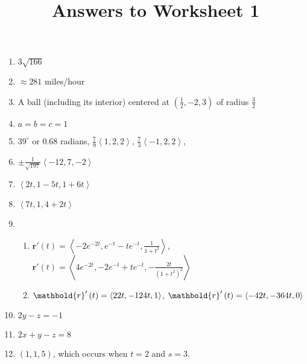 \documentclass[12pt]{article}
\title{Answers to Worksheet 1}
\author{}\date{}
\let\sin\relax\DeclareMathOperator{\sin}{\mathsf{sin}}
\let\cos\relax\DeclareMathOperator{\cos}{\mathsf{cos}}
\begin{document}
\maketitle

\begin{enumerate}
\item $3\sqrt{166}$
\item $\approx 281$ miles/hour
\item A ball (including its interior)
centered at $\left(\frac{1}{2},-2,3\right)$
of radius $\frac{3}{2}$
\item $a=b=c=1$
\item $39^\circ$ or $0.68$ radians,
$\frac{7}{9}\left\langle 1,2,2\right\rangle$,
$\frac{7}{3}\left\langle -1,2,2\right\rangle$,
\item $\pm\frac{1}{\sqrt{197}}\left\langle -12,7,-2\right\rangle$
\item $\left\langle 2t,1-5t,1+6t\right\rangle$
\item $\left\langle 7t,1,4+2t\right\rangle$
\item\begin{enumerate}
\item $\mathbold{r}'\left(t\right)=
\left\langle -2e^{-2t},e^{-t}-te^{-t},\frac{1}{1+t^2}\right\rangle$,
$\mathbold{r}'\left(t\right)=
\left\langle 4e^{-2t},-2e^{-t}+te^{-t},-\frac{2t}{\left(1+t^2\right)^2}\right\rangle$
\item $\mathbold{r}'\left(t\right)=
\left\langle 2\cos{2t},-12\sin{4t},1\right\rangle$,
$\mathbold{r}'\left(t\right)=
\left\langle -4\sin{2t},-36\cos{4t},0\right\rangle$
\end{enumerate}
\item $2y-z=-1$
\item $2x+y-z=8$
\item $\left(1,1,5\right)$, which occurs when $t=2$ and $s=3$.
\end{enumerate}
\end{document}
